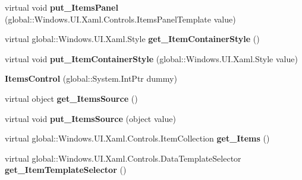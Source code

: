 \begin{DoxyCompactItemize}
virtual void {\bfseries put\+\_\+\+Items\+Panel} (global\+::\+Windows.\+U\+I.\+Xaml.\+Controls.\+Items\+Panel\+Template value)
\item 
\mbox{\label{class_windows_1_1_u_i_1_1_xaml_1_1_controls_1_1_items_control_ac8ecf557d2e90d25785dc40f5d1e3069}} 
virtual global\+::\+Windows.\+U\+I.\+Xaml.\+Style {\bfseries get\+\_\+\+Item\+Container\+Style} ()
\item 
\mbox{\label{class_windows_1_1_u_i_1_1_xaml_1_1_controls_1_1_items_control_a22e6b11c11e2306e3c13c1294b698d47}} 
virtual void {\bfseries put\+\_\+\+Item\+Container\+Style} (global\+::\+Windows.\+U\+I.\+Xaml.\+Style value)
\item 
\mbox{\label{class_windows_1_1_u_i_1_1_xaml_1_1_controls_1_1_items_control_a2a23be568a479e115892800d6b88b77a}} 
{\bfseries Items\+Control} (global\+::\+System.\+Int\+Ptr dummy)
\item 
\mbox{\label{class_windows_1_1_u_i_1_1_xaml_1_1_controls_1_1_items_control_ada6978b5b6da9e42647e7bbae2efa4d9}} 
virtual object {\bfseries get\+\_\+\+Items\+Source} ()
\item 
\mbox{\label{class_windows_1_1_u_i_1_1_xaml_1_1_controls_1_1_items_control_aeea26f9c774f2e66be28cffd70420e8c}} 
virtual void {\bfseries put\+\_\+\+Items\+Source} (object value)
\item 
\mbox{\label{class_windows_1_1_u_i_1_1_xaml_1_1_controls_1_1_items_control_a5f5a8f9fc3aafc90d6f7e7ad33f58698}} 
virtual global\+::\+Windows.\+U\+I.\+Xaml.\+Controls.\+Item\+Collection {\bfseries get\+\_\+\+Items} ()
\item 
\mbox{\label{class_windows_1_1_u_i_1_1_xaml_1_1_controls_1_1_items_control_a9959b8e62f370e00b7c5ba03c1735a6c}} 
virtual global\+::\+Windows.\+U\+I.\+Xaml.\+Controls.\+Data\+Template\+Selector {\bfseries get\+\_\+\+Item\+Template\+Selector} ()

\end{DoxyCompactItemize}
